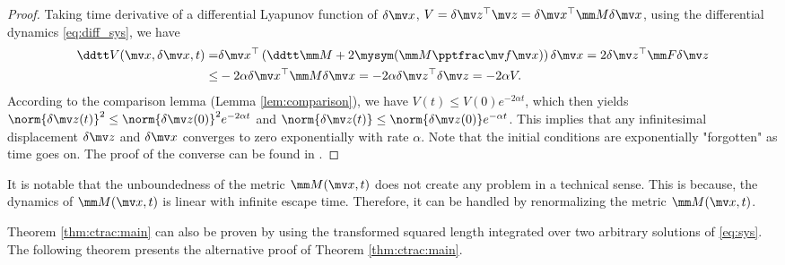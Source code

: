 \begin{proof}
    Taking time derivative of a differential Lyapunov function of $\delta\bdx$, $V=\delta\bdz^\top\bdz=\delta\bdx^\top\mm M\delta\bdx$, using the differential dynamics \eqref{eq:diff_sys}, we have
    \begin{equation}
        \begin{aligned}
            \ddtt V (\bdx, \delta\bdx, t)
            =&
            \delta\bdx^\top
            \left(
                \ddtt\mm M
                +
                2\mysym(\mm M\tpfpx)
            \right)
            \delta\bdx
            =
            2
            \delta\bdz^\top
            \mm F
            \delta \bdz
            \\
            \le&
            -2\alpha
            \delta\bdx^\top
            \mm M
            \delta\bdx
            =
            -
            2\alpha
            \delta\bdz^\top
            \delta\bdz
            =
            -2\alpha V
            .
        \end{aligned}
    \end{equation}
    According to the comparison lemma (Lemma \ref{lem:comparison}), we have $V(t)\le V(0)e^{-2\alpha t}$, which then yields $\norm{\delta\bdz(t)}^2\le\norm{\delta\bdz(0)}^2e^{-2\alpha t}$ and $\norm{\delta\bdz(t)}\le\norm{\delta\bdz(0)}e^{-\alpha t}$.
    This implies that any infinitesimal displacement $\delta\bdz$ and $\delta\bdx$ converges to zero exponentially with rate $\alpha$.
    Note that the initial conditions are exponentially "forgotten" as time goes on.
    The proof of the converse can be found in \cite[Sec. 3.5]{LOHMILLER:1998aa}.
\end{proof}

It is notable that the unboundedness of the metric $\mm M(\bdx, t)$ does not create any problem in a technical sense.
This is because, the dynamics of $\mm M(\bdx, t)$ is linear with infinite escape time.
Therefore, it can be handled by renormalizing the metric $\mm M(\bdx, t)$.

\hfill

Theorem \ref{thm:ctrac:main} can also be proven by using the transformed squared length integrated over two arbitrary solutions of \eqref{eq:sys}.
The following theorem presents the alternative proof of Theorem \ref{thm:ctrac:main}.

